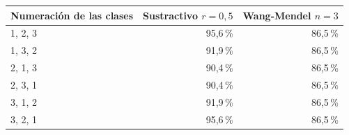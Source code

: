 \begin{tabular}{lrr}
\toprule
Numeración de las clases & Sustractivo $r=0{,}5$ & Wang-Mendel $n=3$ \\
\midrule
1, 2, 3 & 95,6\,\% & 86,5\,\% \\
1, 3, 2 & 91,9\,\% & 86,5\,\% \\
2, 1, 3 & 90,4\,\% & 86,5\,\% \\
2, 3, 1 & 90,4\,\% & 86,5\,\% \\
3, 1, 2 & 91,9\,\% & 86,5\,\% \\
3, 2, 1 & 95,6\,\% & 86,5\,\% \\
\bottomrule
\end{tabular}
